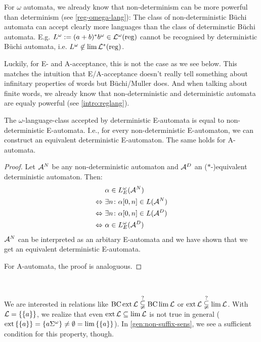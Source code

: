 For $\omega$ automata, we already know that non-determinism can be more powerful than determinism (see \cref{reg-omega-lang}): The class of non-deterministic Büchi automata can accept clearly more languages than the class of determinstic Büchi automata. E.g. $L^\omega := (a+b)^* b^\omega \in \mathcal{L}^\omega(\textup{\textrm{reg}})$ cannot be recognised by deterministic Büchi automata, i.e. $L^\omega \not\in \lim \mathcal{L}^*(\textup{\textrm{reg}})$.

Luckily, for E- and A-acceptance, this is not the case as we see below. This matches the intuition that E/A-acceptance doesn't really tell something about infinitary properties of words but Büchi/Muller does. And when talking about finite words, we already know that non-deterministic and deterministic automata are equaly powerful (see \cref{intro:reglang}).

\begin{lemma}
\label{gen:e-determinism}
The $\omega$-language-class accepted by deterministic E-automata is equal to non-deterministic E-automata. I.e., for every non-deterministic E-automaton, we can construct an equivalent deterministic E-automaton. The same holds for A-automata.
\begin{proof} Let $\mathcal{A}^N$ be any non-deterministic automaton and $\mathcal{A}^D$ an ($*$-)equivalent deterministic automaton. Then:
\begin{align*}
& \alpha \in L^{\omega}_E(\mathcal{A}^N) \\
\Leftrightarrow \ & \exists n \colon \alpha[0,n] \in L(\mathcal{A}^N) \\
\Leftrightarrow \ & \exists n \colon \alpha[0,n] \in L(\mathcal{A}^D) \\
\Leftrightarrow \ & \alpha \in L^{\omega}_E(\mathcal{A}^D)
\end{align*}
$\mathcal{A}^N$ can be interpreted as an arbitary E-automata and we have shown that we get an equivalent deterministic E-automata.

For A-automata, the proof is analoguous.
\end{proof}
\end{lemma}

\

We are interested in relations like $\operatorname{BC} \operatorname{ext} \mathcal{L} \overset{?}{\subsetneqq} \operatorname{BC} \lim \mathcal{L}$ or $\operatorname{ext} \mathcal{L} \overset{?}{\subsetneqq} \lim \mathcal{L}$. With $\Lang = \Set{\Set{a}}$, we realize that even $\operatorname{ext} \mathcal{L} \subseteq \lim \mathcal{L}$ is not true in general ($\ext \Set{\Set{a}} = \Set{a \Sigma^\omega} \neq \emptyset = \lim \Set{\Set{a}}$). In \cref{gen:non-suffix-sens}, we see a sufficient condition for this property, though.

